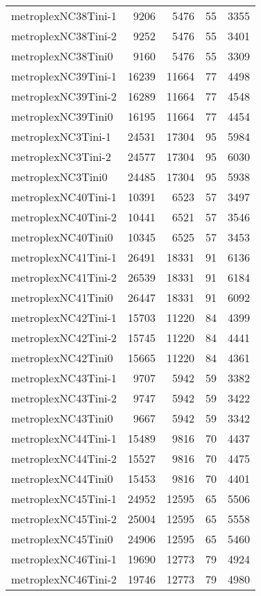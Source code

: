 \begin{tabular}{lrrrr}
metroplexNC38Tini-1 & 9206 & 5476 & 55 & 3355 \\
metroplexNC38Tini-2 & 9252 & 5476 & 55 & 3401 \\
metroplexNC38Tini0 & 9160 & 5476 & 55 & 3309 \\
metroplexNC39Tini-1 & 16239 & 11664 & 77 & 4498 \\
metroplexNC39Tini-2 & 16289 & 11664 & 77 & 4548 \\
metroplexNC39Tini0 & 16195 & 11664 & 77 & 4454 \\
metroplexNC3Tini-1 & 24531 & 17304 & 95 & 5984 \\
metroplexNC3Tini-2 & 24577 & 17304 & 95 & 6030 \\
metroplexNC3Tini0 & 24485 & 17304 & 95 & 5938 \\
metroplexNC40Tini-1 & 10391 & 6523 & 57 & 3497 \\
metroplexNC40Tini-2 & 10441 & 6521 & 57 & 3546 \\
metroplexNC40Tini0 & 10345 & 6525 & 57 & 3453 \\
metroplexNC41Tini-1 & 26491 & 18331 & 91 & 6136 \\
metroplexNC41Tini-2 & 26539 & 18331 & 91 & 6184 \\
metroplexNC41Tini0 & 26447 & 18331 & 91 & 6092 \\
metroplexNC42Tini-1 & 15703 & 11220 & 84 & 4399 \\
metroplexNC42Tini-2 & 15745 & 11220 & 84 & 4441 \\
metroplexNC42Tini0 & 15665 & 11220 & 84 & 4361 \\
metroplexNC43Tini-1 & 9707 & 5942 & 59 & 3382 \\
metroplexNC43Tini-2 & 9747 & 5942 & 59 & 3422 \\
metroplexNC43Tini0 & 9667 & 5942 & 59 & 3342 \\
metroplexNC44Tini-1 & 15489 & 9816 & 70 & 4437 \\
metroplexNC44Tini-2 & 15527 & 9816 & 70 & 4475 \\
metroplexNC44Tini0 & 15453 & 9816 & 70 & 4401 \\
metroplexNC45Tini-1 & 24952 & 12595 & 65 & 5506 \\
metroplexNC45Tini-2 & 25004 & 12595 & 65 & 5558 \\
metroplexNC45Tini0 & 24906 & 12595 & 65 & 5460 \\
metroplexNC46Tini-1 & 19690 & 12773 & 79 & 4924 \\
metroplexNC46Tini-2 & 19746 & 12773 & 79 & 4980 \\

\end{tabular}
